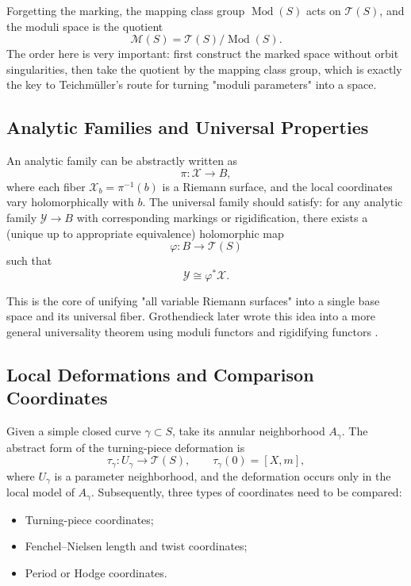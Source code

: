 \documentclass[UTF8,a4paper,11pt]{article}
\begin{document}
Forgetting the marking, the mapping class group $\operatorname{Mod}(S)$ acts on $\mathcal T(S)$, and the moduli space is the quotient
\[
  \mathcal M(S)=\mathcal T(S)/\operatorname{Mod}(S).
\]
The order here is very important: first construct the marked space without orbit singularities, then take the quotient by the mapping class group, which is exactly the key to Teichmüller's route for turning "moduli parameters" into a space.

\subsection{Analytic Families and Universal Properties}

An analytic family can be abstractly written as
\[
  \pi:\mathcal X\longrightarrow B,
\]
where each fiber $\mathcal X_b=\pi^{-1}(b)$ is a Riemann surface, and the local coordinates vary holomorphically with $b$. The universal family should satisfy: for any analytic family $\mathcal Y\to B$ with corresponding markings or rigidification, there exists a (unique up to appropriate equivalence) holomorphic map
\[
  \varphi:B\longrightarrow\mathcal T(S)
\]
such that
\[
  \mathcal Y\cong \varphi^*\mathcal X.
\]

This is the core of unifying "all variable Riemann surfaces" into a single base space and its universal fiber. Grothendieck later wrote this idea into a more general universality theorem using moduli functors and rigidifying functors \cite{ACampo2016}.

\subsection{Local Deformations and Comparison Coordinates}

Given a simple closed curve $\gamma\subset S$, take its annular neighborhood $A_\gamma$. The abstract form of the turning-piece deformation is
\[
  \tau_\gamma:U_\gamma\longrightarrow \mathcal T(S),
  \qquad \tau_\gamma(0)=[X,m],
\]
where $U_\gamma$ is a parameter neighborhood, and the deformation occurs only in the local model of $A_\gamma$. Subsequently, three types of coordinates need to be compared:

\begin{itemize}
  \item Turning-piece coordinates;
  \item Fenchel--Nielsen length and twist coordinates;
  \item Period or Hodge coordinates.
\end{itemize}
\end{document}
